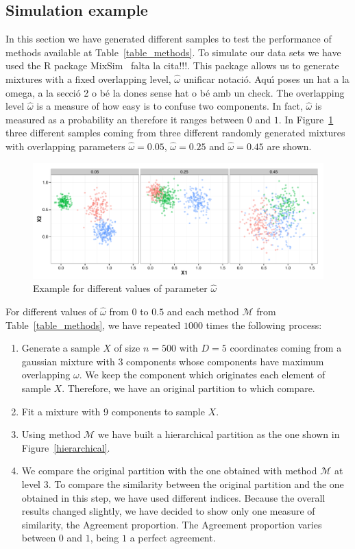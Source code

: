 \documentclass[10pt, a4paper]{article}
\begin{document}
\begin{spacing}{1.9}
\subsection{Simulation example}

In this section we have generated different samples to test the performance of methods available at Table~\ref{table_methods}. To simulate our data sets we have used the R package MixSim~\citep{Citar mixxim} {\color{blue} falta la cita!!!}. This package allows us to generate mixtures with a fixed overlapping level, $\hat{\omega}$ {\color{blue} unificar notaci\'{o}. Aqu\'{\i} poses un hat a la omega, a la secci\'{o} 2 o b\'{e} la dones sense hat o b\'{e} amb un check}. The overlapping level $\hat{\omega}$ is a measure of how easy is to confuse two components. In fact,  $\hat{\omega}$ is measured as a probability an therefore it ranges between $0$ and $1$. In Figure~\ref{omega} three different samples coming from three different randomly generated mixtures with overlapping parameters  $\hat{\omega}=0.05$, $\hat{\omega}=0.25$ and $\hat{\omega}=0.45$ are shown.

\begin{figure}[!t]
\centering
\includegraphics[scale=.5]{omega.pdf}
\caption{Example for different values of parameter $\hat{\omega}$}
\label{omega}
\end{figure}


For different values of $\hat{\omega}$ from $0$ to $0.5$ and each method $\mathcal{M}$ from Table~\ref{table_methods},  we  have repeated $1000$ times the following process:
\begin{enumerate}
\item Generate a sample $X$ of size $n=500$ with $D=5$ coordinates coming from a gaussian mixture with $3$ components whose components have maximum overlapping $\omega$. We keep the component which originates each element of sample $X$. Therefore, we have an original partition to which compare.
\item Fit a mixture with 9 components to sample $X$.
\item Using method $\mathcal{M}$ we have built a hierarchical partition as the one shown in Figure~\ref{hierarchical}.
\item We compare the original partition with the one obtained with method $\mathcal{M}$ at level $3$. To compare the similarity between the original partition and the one obtained in this step, we have used different indices. Because the overall results changed slightly, we have decided to show only one measure of similarity, the Agreement proportion. The Agreement proportion varies between $0$ and $1$, being $1$ a perfect agreement.
\end{enumerate}


\end{spacing}
\end{document}
